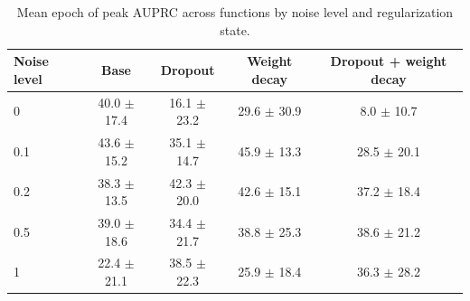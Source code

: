\begin{table}[htbp]
\centering
\begin{tabular}{lcccc}
\toprule
Noise level & Base & Dropout & Weight decay & Dropout + weight decay \\
\midrule
0 & 40.0 $\pm$ 17.4 & 16.1 $\pm$ 23.2 & 29.6 $\pm$ 30.9 & 8.0 $\pm$ 10.7 \\
0.1 & 43.6 $\pm$ 15.2 & 35.1 $\pm$ 14.7 & 45.9 $\pm$ 13.3 & 28.5 $\pm$ 20.1 \\
0.2 & 38.3 $\pm$ 13.5 & 42.3 $\pm$ 20.0 & 42.6 $\pm$ 15.1 & 37.2 $\pm$ 18.4 \\
0.5 & 39.0 $\pm$ 18.6 & 34.4 $\pm$ 21.7 & 38.8 $\pm$ 25.3 & 38.6 $\pm$ 21.2 \\
1 & 22.4 $\pm$ 21.1 & 38.5 $\pm$ 22.3 & 25.9 $\pm$ 18.4 & 36.3 $\pm$ 28.2 \\
\bottomrule
\end{tabular}
\caption{Mean epoch of peak AUPRC across functions by noise level and regularization state.}
\end{table}

